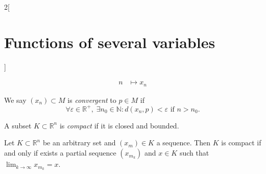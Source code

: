 \documentclass[class=article,10pt,crop=false]{standalone}
\begin{document}
\begin{multicols}{2}[\section{Functions of several variables}]
\begin{definition}
\begin{align*}
    n&\mapsto x_n
\end{align*}
\end{definition}
\begin{definition}
We say $(x_n)\subset M$ is \textit{convergent} to $p\in M$ if $$\forall\varepsilon\in\mathbb{R}^+,\;\exists n_0\in\mathbb{N}:d(x_n,p)<\varepsilon\text{ if }n>n_0.$$
\end{definition}
\begin{definition}
A subset $K\subset\mathbb{R}^n$ is \textit{compact} if it is closed and bounded.
\end{definition}
\begin{theorem}
Let $K\subset\mathbb{R}^n$ be an arbitrary set and $(x_m)\in K$ a sequence. Then $K$ is compact if and only if exists a partial sequence $(x_{m_k})$ and $x\in K$ such that $\displaystyle\lim_{k\to\infty}x_{m_k}=x$.
\end{theorem}

\end{multicols}
\end{document}

